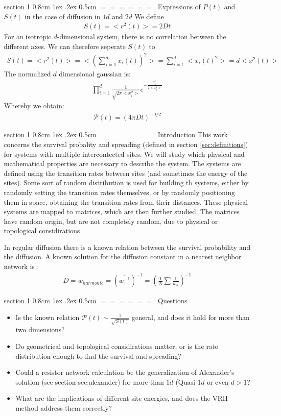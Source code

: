 \documentclass[onecolumn,fleqn,notitlepage,secnumarabic]{revtex4}
\makeatletter
\newcommand{\beq}{\begin{eqnarray}}
\newcommand{\eeq}{\end{eqnarray}}
\def\section{%
  \@startsection
    {section}%
    {1}%
    {\z@}%
    {0.8cm \@plus1ex \@minus .2ex}%
    {0.5cm}%
    {\Large\bf $=\!=\!=\!=\!=\!=\;$}%
}%
\makeatother
\begin{document}
\section{Expressions of $P(t)$ and $S(t)$ in the case of diffusion in $1d$ and $2d$}
We define 
\beq
  S(t) = <r^2(t)> = 2Dt
\eeq
For an isotropic $d$-dimensional system, there is no correlation between the different axes. We can therefore seperate $S(t)$ to 
%
\beq 
  S(t) =<r^2(t)> = < \left(\sum_{i=1}^d x_i(t) \right)^2 > = \sum_{i=1}^d <x_i(t)^2> = d<x^2(t)>
\eeq
The normalized $d$ dimensional gaussian is:
%
\beq
  \prod_{i=1}^d \frac{1}{\sqrt{2\pi <x_i^2> }}e^{-\frac{x_i^2}{2<x_i^2>}}
\eeq
%
Whereby we obtain:
%
\beq\label{eq:surv_d}
  \mathcal{P}(t) = (4\pi D t)^{-d/2}
\eeq
%

\section{Introduction}
This work concerns the survival probality and spreading (defined in section \ref{sec:definitions}) for systems with multiple intercontected sites. We will study which physical and mathematical properties are necessary to describe the system. The systems are defined using the transition rates between sites (and sometimes the energy of the sites). Some sort of random distribution is used for building th systems, either by randomly setting the transition rates themselves, or by randomly positioning them in space, obtaining the transition rates from their distances. These physical systems are mapped to matrices, which are then further studied. The matrices have random origin, but are not completely random, due to physical or topological considirations.


In regular diffusion there is a known relation between the survival probability and the diffusion. 
A known solution for the diffusion constant in a nearest neighbor network is \cite{Derrida:1983}:
\begin{align}
D=\overline{w}_{harmonic} =(\overline{w^{-1}})^{-1}=\left(\frac{1}{N}\sum\frac{1}{w_n}\right)^{-1}
\end{align}

\section{Questions}
\begin{itemize}
    \item Is the known relation $\mathcal{P}(t) \sim \frac{1}{\sqrt{S(t)}}$ general, and does it hold for more than two dimensions?
    \item Do geometrical and topological considirations matter, or is the rate distribution enough to find the survival and spreading?
    \item Could a resistor network calculation be the generalization of Alexander's solution (see section {sec:alexander}) for more than $1d$ (Quasi $1d$ or even $d>1$?
    \item What are the implications of different site energies, and does the VRH method address them correctly?
\end{itemize}
\end{document}
